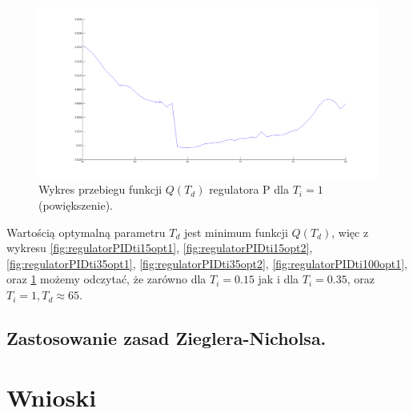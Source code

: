 \documentclass[a4paper,10pt]{article}
\begin{document}
\begin{figure}[!h]
    \centering
	\includegraphics[width=130mm]{CW2-regulatorPID-ti100-opt2.png}
	\caption{Wykres przebiegu funkcji $Q(T_{d})$ regulatora P dla $T_{i}=1$ (powiększenie).}
    \label{fig:regulatorPIDti100opt2}
\end{figure}
\newpage Wartością optymalną parametru $T_{d}$ jest minimum funkcji $Q(T_{d})$, więc z wykresu \ref{fig:regulatorPIDti15opt1}, \ref{fig:regulatorPIDti15opt2}, \ref{fig:regulatorPIDti35opt1}, \ref{fig:regulatorPIDti35opt2}, \ref{fig:regulatorPIDti100opt1}, oraz \ref{fig:regulatorPIDti100opt2} możemy odczytać, że zarówno dla $T_{i}=0.15$ jak i dla $T_{i}=0.35$, oraz $T_{i}=1, T_{d} \approx 65$.

\subsection{Zastosowanie zasad Zieglera-Nicholsa.}\label{sec:zad3}

\section{Wnioski}
\end{document}
